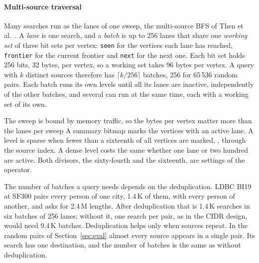 \paragraph{Multi-source traversal} Many searches run as the lanes of one sweep, the multi-source BFS of Then et
al.~\cite{then2014msbfs}. A \emph{lane} is one search, and a \emph{batch} is up to 256 lanes that share one
\emph{working set} of three bit sets per vertex: \texttt{seen} for the vertices each lane has reached,
\texttt{frontier} for the current frontier and \texttt{next} for the next one. Each bit set holds 256 bits, 32 bytes,
per vertex, so a working set takes 96 bytes per vertex. A query with $k$ distinct sources therefore has
$\lceil k/256 \rceil$ batches, 256 for 65\,536 random pairs. Each batch runs its own levels until all its lanes are
inactive, independently of the other batches, and several can run at the same time, each with a working set
of its own.

 The sweep is bound by memory traffic, so the bytes per vertex matter more than the
lanes per sweep A summary bitmap
marks the vertices with an active lane. A level is sparse when fewer than a sixteenth of all vertices are marked,
, through the source index. A dense level costs the
same whether one lane or two hundred are active. Both divisors, the sixty-fourth and the sixteenth, are settings of
the operator.

The number of batches a query needs depends on the deduplication. LDBC BI19 at SF300 pairs every person of one city,
1.4\,K of them, with every person of another, and asks for 2.4\,M lengths. After deduplication that is 1.4\,K searches
in six batches of 256 lanes; without it, one search per pair, as in the CIDR design, would need 9.4\,K batches.
Deduplication helps only when sources repeat. In the random pairs of Section~\ref{sec:eval} almost every source
appears in a single pair. Its search has one destination, and the number of batches is the same as without
deduplication.

